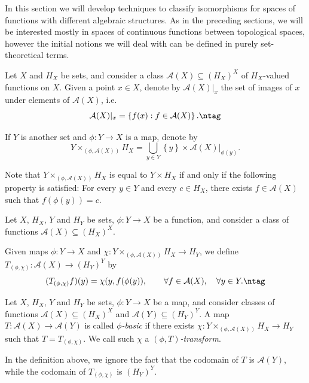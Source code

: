 In this section we will develop techniques to classify isomorphisms for spaces of functions with different algebraic structures. As in the preceding sections, we will be interested mostly in spaces of continuous functions between topological spaces, however the initial notions we will deal with can be defined in purely set-theoretical terms.

Let $X$ and $H_X$ be sets, and consider a class $\mathcal{A}(X)\subseteq(H_X)^X$ of $H_X$-valued functions on $X$. Given a point $x\in X$, denote by $\mathcal{A}(X)|_x$ the set of images of $x$ under elements of $\mathcal{A}(X)$, i.e.
\[\mathcal{A}(X)|_x=\left\{f(x):f\in\mathcal{A}(X)\right\}.\ntag\label{definitionimageofpointunderclassoffunction}\]

If $Y$ is another set and $\phi:Y\to X$ is a map, denote by
\[Y\times_{(\phi,\mathcal{A}(X))} H_X=\bigcup_{y\in Y}\left\{y\right\}\times\mathcal{A}(X)|_{\phi(y)}.\]

Note that $Y\times_{(\phi,\mathcal{A}(X))} H_X$ is equal to $Y\times H_X$ if and only if the following property is satisfied: For every $y\in Y$ and every $c\in H_X$, there exists $f\in\mathcal{A}(X)$ such that $f(\phi(y))=c$.

\begin{definition}\label{definitionttransform}
Let $X$, $H_X$, $Y$ and $H_Y$ be sets, $\phi:Y\to X$ be a function, and consider a class of functions $\mathcal{A}(X)\subseteq (H_X)^X$.

Given maps $\phi:Y\to X$ and $\chi:Y\times_{(\phi,\mathcal{A}(X))} H_X\to H_Y$, we define $T_{(\phi,\chi)}:\mathcal{A}(X)\to (H_Y)^Y$ by
\[(T_{(\phi,\chi)}f)(y)=\chi(y,f(\phi(y)),\qquad\forall f\in\mathcal{A}(X),\quad\forall y\in Y.\ntag\label{definitiontphichi}\]
\end{definition}

\begin{definition}
Let $X$, $H_X$, $Y$ and $H_Y$ be sets, $\phi:Y\to X$ be a map, and consider classes of functions $\mathcal{A}(X)\subseteq (H_X)^X$ and $\mathcal{A}(Y)\subseteq (H_Y)^Y$. A map $T:\mathcal{A}(X)\to\mathcal{A}(Y)$ is called \emph{$\phi$-basic} if there exists $\chi:Y\times_{(\phi,\mathcal{A}(X))} H_X\to H_Y$ such that $T=T_{(\phi,\chi)}$. We call such $\chi$ a \emph{$(\phi,T)$-transform}.
\end{definition}

\begin{remark}
In the definition above, we ignore the fact that the codomain of $T$ is $\mathcal{A}(Y)$, while the codomain of $T_{(\phi,\chi)}$ is $(H_Y)^Y$.
\end{remark}

